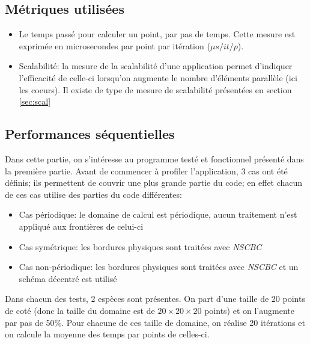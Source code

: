 \subsection{Métriques utilisées}
\begin{itemize}
\item Le temps passé pour calculer un point, par pas de temps. Cette mesure est exprimée en microsecondes par point par itération ($\mu s/it/p$).

\item Scalabilité: la mesure de la scalabilité d'une application permet d'indiquer l'efficacité de celle-ci lorsqu'on augmente le nombre d'éléments parallèle (ici les coeurs). Il existe de type de mesure de scalabilité présentées en section \ref{sec:scal}



\end{itemize}




\subsection{Performances séquentielles}
Dans cette partie, on s'intéresse au programme testé et fonctionnel présenté dans la première partie. Avant de commencer à profiler l'application, 3 cas ont été définis; ils permettent de couvrir une plus grande partie du code; en effet chacun de ces cas utilise des parties du code différentes:

\begin{itemize}
\item Cas périodique: le domaine de calcul est périodique, aucun traitement n'est appliqué aux frontières de celui-ci
\item Cas symétrique: les bordures physiques sont traitées avec \textit{NSCBC} 
\item Cas non-périodique: les bordures physiques sont traitées avec \textit{NSCBC} et un schéma décentré est utilisé 
\end{itemize}


Dans chacun des tests, 2 espèces sont présentes. On part d'une taille de 20 points de coté (donc la taille du domaine est de $20\times20\times20$ points) et on l'augmente par pas de 50\%. Pour chacune de ces taille de domaine, on réalise 20 itérations et on calcule la moyenne des temps par points de celles-ci.

